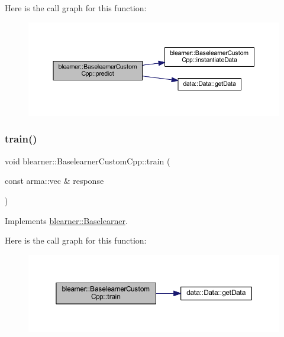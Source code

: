 Here is the call graph for this function\+:
\nopagebreak
\begin{figure}[H]
\begin{center}
\leavevmode
\includegraphics[width=350pt]{classblearner_1_1_baselearner_custom_cpp_a55fb45a929fea01f79fa3dcad7698174_cgraph}
\end{center}
\end{figure}
\mbox{\label{classblearner_1_1_baselearner_custom_cpp_a7437b1175498b928d3202b586527d2c4}} 
\subsubsection{\texorpdfstring{train()}{train()}}
{\footnotesize\ttfamily void blearner\+::\+Baselearner\+Custom\+Cpp\+::train (\begin{DoxyParamCaption}\item[{const arma\+::vec \&}]{response }\end{DoxyParamCaption})\hspace{0.3cm}{\ttfamily [virtual]}}



Implements \mbox{\hyperlink{classblearner_1_1_baselearner_a40e03ad070b9a03aae706d9ee8094b80}{blearner\+::\+Baselearner}}.

Here is the call graph for this function\+:
\nopagebreak
\begin{figure}[H]
\begin{center}
\leavevmode
\includegraphics[width=350pt]{classblearner_1_1_baselearner_custom_cpp_a7437b1175498b928d3202b586527d2c4_cgraph}
\end{center}
\end{figure}


